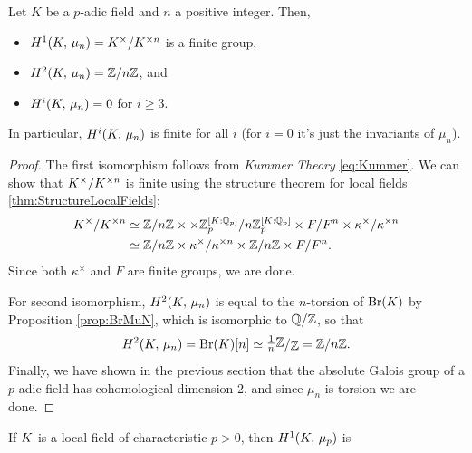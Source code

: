 \documentclass[a4paper, oneside]{memoir}
\begin{document}
\begin{theorem}\label{thm:CohomMuN}
    Let $K$ be a $p$-adic field and $n$ a positive integer.
    Then,
    \begin{itemize}
        \item $H^{1}( K, \, \mu_n ) = K^\times/K^{\times n}$ is a finite group,
        \item $H^{2}( K, \, \mu_n ) = \mathbb{Z}/n\mathbb{Z}$, and
        \item $H^{i}( K, \, \mu_n ) = 0$ for $i\geq 3$.
    \end{itemize}
    In particular, $H^{i}( K, \, \mu_n )$ is finite for all $i$ (for $i=0$ it's just the invariants of $\mu_n$).
\end{theorem}
\begin{proof}
    The first isomorphism follows from \textit{Kummer Theory} \eqref{eq:Kummer}. We can show that $K^\times/K^{\times n}$ is finite using the structure theorem for local fields \ref{thm:StructureLocalFields}:
    \begin{align*}
        K^\times/K^{\times n} & \simeq \mathbb{Z}/n\mathbb{Z} \times  \times \mathbb{Z}_p^{[K:\mathbb{Q}_p]}/n \mathbb{Z}_p^{[K:\mathbb{Q}_p]} \times F/F^n \times  \kappa^\times/\kappa^{\times n} \\
                                & \simeq \mathbb{Z}/n\mathbb{Z} \times \kappa^\times/\kappa^{\times n} \times  \mathbb{Z}/n\mathbb{Z} \times F/F^n.
    \end{align*}
    Since both $\kappa^\times$ and $F$ are finite groups, we are done.

    For second isomorphism, $H^{2}( K, \, \mu_n )$ is equal to the $n$-torsion of $\mathrm{Br}(K)$ by Proposition \ref{prop:BrMuN}, which is isomorphic to $\mathbb{Q}/\mathbb{Z}$, so that
    \[
        \H{2}{\K}{\mu_n} = \Br{\K}[n] \simeq \ssfrac{\frac{1}{n}\Z}{\Z} = \Z/n\Z.
    \]
    Finally, we have shown in the previous section that the absolute Galois group of a $p$-adic field has cohomological dimension 2, and since $\mu_n$ is torsion we are done.
\end{proof}

\begin{remark}\label{rm:H1CharP}
    If $K$ is a local field of characteristic $p>0$, then $H^{1}( K, \, \mu_p )$ is
\end{remark}
\end{document}
